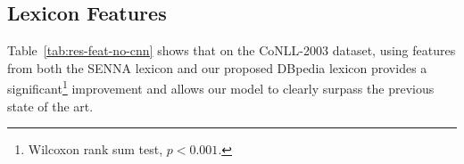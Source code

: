 \documentclass[11pt,letterpaper]{article}
\begin{document}
%
%

\subsection{Lexicon Features}
\label{sec:lexicon-results}

Table~\ref{tab:res-feat-no-cnn} shows that on the CoNLL-2003 dataset, using features from both the SENNA lexicon and our proposed DBpedia lexicon provides a significant\footnote{Wilcoxon rank sum test, $p < 0.001$.} improvement and allows our model to clearly surpass the previous state of the art. 
\end{document}
